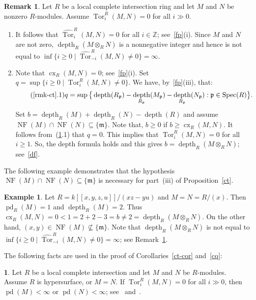 \documentclass[11pt]{amsart}
\theoremstyle{definition}
\theoremstyle{definition}
\newtheorem{eg}[thm]{Example}
\newtheorem{rmk}[thm]{Remark}
\newtheorem{chunk}[thm]{\hspace*{-1.065ex}\bf}
\numberwithin{equation}{section}
\newcommand{\fm}{\mathfrak{m}}
\newcommand{\fp}{\mathfrak{p}}
\newcommand{\ZZ}{\mathbb{Z}}
\DeclareMathOperator{\cx}{cx}
\DeclareMathOperator{\depth}{depth}
\DeclareMathOperator{\pd}{pd}
\DeclareMathOperator{\Spec}{Spec}
\DeclareMathOperator{\Tor}{Tor}
\DeclareMathOperator{\NF}{NF}
\begin{document}
\begin{rmk} \label{rmk-ct} Let $R$ be a local complete intersection ring and let $M$ and $N$ be nonzero $R$-modules. Assume $\Tor_i^R(M,N)=0$ for all $i\gg 0$.
\begin{enumerate}[\rm(i)]
\item It follows that $\widehat{\Tor}_{i}^R(M,N)=0$ for all $i\in \ZZ$; see~\ref{fp}(i). Since $M$ and $N$ are not zero, $\depth_R(M\otimes_RN)$ is a nonnegative integer and hence is not equal to $\inf \big\{i\geq0\mid\widehat{\Tor}_{-i}^R(M,N)\neq0\big\}=\infty$. 

\item Note that $\cx_R(M,N)=0$; see~\ref{fp}(i). Set $q=\sup\{i\geq 0 \mid\Tor_i^R(M,N)\neq0\}$. We have, by~\ref{fp}(iii), that:
\[\tag{\ref{rmk-ct}.1}
q=\sup\big\{\depth(R_\fp)-\depth_{R_{\fp}}(M_\fp)-\depth_{R_{\fp}}(N_\fp): \fp\in\Spec(R)\big \}.
\]
Set $b=\depth_R(M)+\depth_R(N)-\depth(R)$ and assume $\NF(M)\cap\NF(N)\subseteq\{\fm\}$. Note that, $b\geq 0$ if $b\geq \cx_R(M,N)$. It follows from~(\ref{rmk-ct}.1) that $q=0$. This implies that $\Tor_i^R(M,N)=0$ for all $i\geq 1$. So, the depth formula holds and this gives $b=\depth_R(M\otimes_RN)$; see~\ref{df}. 
\end{enumerate}
\end{rmk}

The following example demonstrates that the hypothesis $\NF(M) \cap \NF(N) \subseteq \{\fm\}$ is necessary for part~(iii) of Proposition~\ref{ct}.

\begin{eg} Let $R=k[\![x,y,z,u]\!]/(xz-yu)$ and $M=N=R/(x)$. Then $\pd_R(M)=1$ and $\depth_R(M)=2$. Thus $\cx_R(M,N)=0<1= 2+2-3=b \neq 2=\depth_R(M\otimes_RN)$. On the other hand, $(x,y) \in \NF(M) \not\subseteq \{\fm\}$. Note that $\depth_R(M\otimes_RN)$ is not equal to $\inf \big\{i\geq0\mid\widehat{\Tor}_{-i}^R(M,N)\neq0\big\}=\infty$; see Remark~\ref{rmk-ct}.
\end{eg}

The following facts are used in the proof of Corollaries~\ref{ct-cor} and~\ref{cq}:

\begin{chunk} \label{TVFPD} Let $R$ be a local complete intersection and let $M$ and $N$ be $R$-modules. Assume $R$ is hypersurface, or $M=N$. If $\Tor_i^R(M,N)=0$ for all $i\gg 0$, then $\pd(M)<\infty$ or $\pd(N)<\infty$; see~\cite[1.9]{HW2} and~\cite[1.2]{Jo2}. 
\end{chunk}
\end{document}
